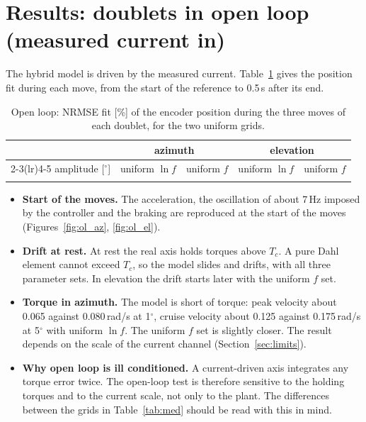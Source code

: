 \documentclass[10pt,a4paper]{article}
\numberwithin{equation}{section}
\begin{document}
\section{Results: doublets in open loop (measured current in)}\label{sec:res_ol}
The hybrid model is driven by the measured current. Table~\ref{tab:ol} gives the position fit during each move, from the start of the reference to 0.5\,s after its end.

\begin{table}[H]\centering\footnotesize\setlength{\tabcolsep}{4pt}
\caption{Open loop: NRMSE fit [\%] of the encoder position during the three moves of each doublet, for the two uniform grids.}\label{tab:ol}
\begin{tabular}{lllll}\toprule
& \multicolumn{2}{c}{azimuth} & \multicolumn{2}{c}{elevation} \\
\cmidrule(lr){2-3}\cmidrule(lr){4-5}
amplitude [$^\circ$] & uniform $\ln f$ & uniform $f$ & uniform $\ln f$ & uniform $f$ \\ \midrule
\\ \bottomrule
\end{tabular}\end{table}

\begin{itemize}
\item \textbf{Start of the moves.} The acceleration, the oscillation of about 7\,Hz imposed by the controller and the braking are reproduced at the start of the moves (Figures~\ref{fig:ol_az}, \ref{fig:ol_el}).
\item \textbf{Drift at rest.} At rest the real axis holds torques above $T_c$. A pure Dahl element cannot exceed $T_c$, so the model slides and drifts, with all three parameter sets. In elevation the drift starts later with the uniform $f$ set.
\item \textbf{Torque in azimuth.} The model is short of torque: peak velocity about 0.065 against 0.080\,rad/s at 1$^\circ$, cruise velocity about 0.125 against 0.175\,rad/s at 5$^\circ$ with uniform $\ln f$. The uniform $f$ set is slightly closer. The result depends on the scale of the current channel (Section~\ref{sec:limits}).
\item \textbf{Why open loop is ill conditioned.} A current-driven axis integrates any torque error twice. The open-loop test is therefore sensitive to the holding torques and to the current scale, not only to the plant. The differences between the grids in Table~\ref{tab:med} should be read with this in mind.
\end{itemize}
\end{document}
